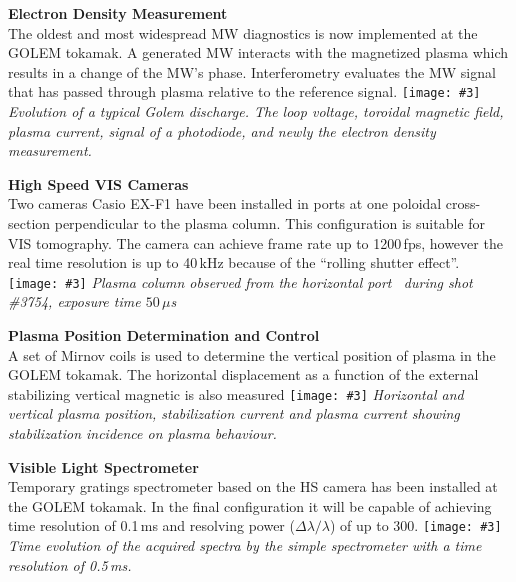 \documentclass[portrait,final,a0paper]{baposter}
\begin{document}
\begin{poster}
{
  \def\contr#1#2#3#4#5{
  \begin{minipage}{0.48\textwidth}
  {\bf #1}\\
  { #2}
  \texttt{[image: \#3]}
  {\it { #5}}
  \end{minipage}}
\begin{multicols}{2}
 \contr{Electron Density Measurement}{The oldest and most widespread MW diagnostics is now implemented at the GOLEM tokamak. A generated MW interacts with the magnetized plasma which results in a change of the MW's phase. Interferometry evaluates the MW signal that has passed through plasma relative to the reference signal.}{density}{1}{Evolution of a typical Golem discharge. The loop voltage, toroidal magnetic field, plasma current, signal of a photodiode, and newly the electron density measurement.}
\medskip

    \contr{High Speed VIS Cameras}{Two cameras Casio EX-F1 have been installed in ports at one poloidal cross-section  perpendicular to the plasma column. This configuration is suitable for VIS tomography. The camera can achieve frame rate up to 1200\,fps, however the real time resolution is up to 40\,kHz because of the ``rolling shutter effect''.}{plasma-HS-camera-image2}{1}{{ Plasma column observed from the horizontal port \, during shot \#3754, exposure time $50\,\mu$s}}

 \contr{Plasma Position Determination and Control}{A set of Mirnov coils is used to determine the vertical position of plasma in the GOLEM tokamak. The horizontal displacement as a function of the external stabilizing
    vertical magnetic is also measured}{position}{1}{Horizontal and vertical plasma position, stabilization current and plasma current showing stabilization incidence on plasma behaviour.}

\smallskip

    \contr{Visible Light Spectrometer}{Temporary gratings spectrometer based on the HS camera has been installed at the GOLEM tokamak. In the final configuration it will be capable of achieving time resolution of 0.1\,ms and resolving power ($\Delta \lambda/\lambda$) of up to 300. }{SpectrumEvolution4}{1.05}{  Time evolution of the acquired spectra by the simple spectrometer with a time  resolution of 0.5\,ms.}
\end{multicols}
}


\end{poster}
\end{document}
